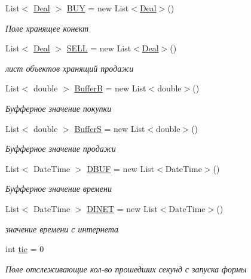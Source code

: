 \begin{DoxyCompactItemize}
List$<$ \hyperlink{class_client_1_1_deal}{Deal} $>$ \hyperlink{class_client_1_1_windowd_aec1343722b0bde8b263e8258fc8f806c}{B\+UY} = new List$<$\hyperlink{class_client_1_1_deal}{Deal}$>$()
\begin{DoxyCompactList}\small\item\em Поле хранящее конект \end{DoxyCompactList}\item 
List$<$ \hyperlink{class_client_1_1_deal}{Deal} $>$ \hyperlink{class_client_1_1_windowd_a1616dcfb8b780f2ff45f74a76cb7d997}{S\+E\+LL} = new List$<$\hyperlink{class_client_1_1_deal}{Deal}$>$()
\begin{DoxyCompactList}\small\item\em лист объектов хранящий продажи \end{DoxyCompactList}\item 
List$<$ double $>$ \hyperlink{class_client_1_1_windowd_a63515d43501540d22908b3e75b0446e6}{BufferB} = new List$<$double$>$()
\begin{DoxyCompactList}\small\item\em Буфферное значение покупки \end{DoxyCompactList}\item 
List$<$ double $>$ \hyperlink{class_client_1_1_windowd_a923a51f80de2de0db93114454f23e6cb}{BufferS} = new List$<$double$>$()
\begin{DoxyCompactList}\small\item\em Буфферное значение продажи \end{DoxyCompactList}\item 
List$<$ Date\+Time $>$ \hyperlink{class_client_1_1_windowd_ae56192c0587527c76b5878d3239768e4}{D\+B\+UF} = new List$<$Date\+Time$>$()
\begin{DoxyCompactList}\small\item\em Буфферное значение времени \end{DoxyCompactList}\item 
List$<$ Date\+Time $>$ \hyperlink{class_client_1_1_windowd_a98b5779ed4abf0571a16deb0c985a7a4}{D\+I\+N\+ET} = new List$<$Date\+Time$>$()
\begin{DoxyCompactList}\small\item\em значение времени с интернета \end{DoxyCompactList}\item 
int \hyperlink{class_client_1_1_windowd_af0c658d1138b70eeafdbc105ec2d7a81}{tic} = 0
\begin{DoxyCompactList}\small\item\em Поле отслеживающие кол-\/во прошедших секунд с запуска формы \end{DoxyCompactList}\end{DoxyCompactItemize}
